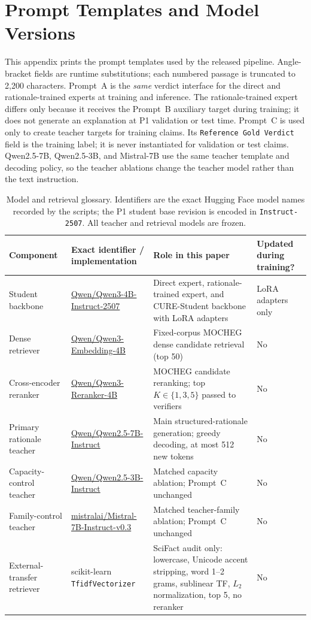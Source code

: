 \documentclass[11pt]{article}
\begin{document}
\section{Prompt Templates and Model Versions}\label{app:prompts-models}
This appendix prints the prompt templates used by the released pipeline. Angle-bracket fields are runtime substitutions; each numbered passage is truncated to 2,200 characters. Prompt~A is the \emph{same} verdict interface for the direct and rationale-trained experts at training and inference. The rationale-trained expert differs only because it receives the Prompt~B auxiliary target during training; it does not generate an explanation at P1 validation or test time. Prompt~C is used only to create teacher targets for training claims. Its \texttt{Reference Gold Verdict} field is the training label; it is never instantiated for validation or test claims. Qwen2.5-7B, Qwen2.5-3B, and Mistral-7B use the same teacher template and decoding policy, so the teacher ablations change the teacher model rather than the text instruction.

\begin{table}[!t]
\centering\small
\renewcommand{\arraystretch}{1.08}
\begin{tabular}{@{}p{2.10cm}p{4.15cm}p{4.95cm}p{2.00cm}@{}}
\toprule
Component & Exact identifier / implementation & Role in this paper & Updated during training?\\
\midrule
Student backbone & \url{Qwen/Qwen3-4B-Instruct-2507} & Direct expert, rationale-trained expert, and \textsc{CURE}-Student backbone with LoRA adapters & LoRA adapters only\\
Dense retriever & \url{Qwen/Qwen3-Embedding-4B} & Fixed-corpus MOCHEG dense candidate retrieval (top 50) & No\\
Cross-encoder reranker & \url{Qwen/Qwen3-Reranker-4B} & MOCHEG candidate reranking; top $K\in\{1,3,5\}$ passed to verifiers & No\\
Primary rationale teacher & \url{Qwen/Qwen2.5-7B-Instruct} & Main structured-rationale generation; greedy decoding, at most 512 new tokens & No\\
Capacity-control teacher & \url{Qwen/Qwen2.5-3B-Instruct} & Matched capacity ablation; Prompt~C unchanged & No\\
Family-control teacher & \url{mistralai/Mistral-7B-Instruct-v0.3} & Matched teacher-family ablation; Prompt~C unchanged & No\\
External-transfer retriever & scikit-learn \texttt{TfidfVectorizer} & SciFact audit only: lowercase, Unicode accent stripping, word 1--2 grams, sublinear TF, $L_2$ normalization, top 5, no reranker & No\\
\bottomrule
\end{tabular}
\caption{Model and retrieval glossary. Identifiers are the exact Hugging Face model names recorded by the scripts; the P1 student base revision is encoded in \texttt{Instruct-2507}. All teacher and retrieval models are frozen.}\label{tab:model-glossary}
\end{table}
\end{document}
